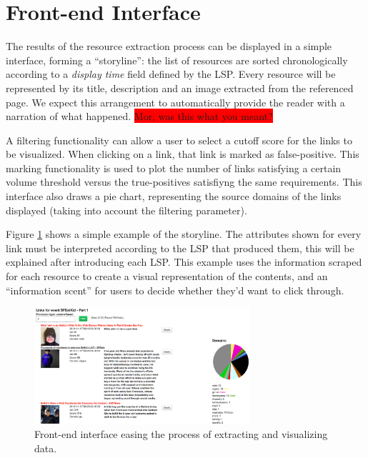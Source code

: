\documentclass{sig-alternate}
\newcommand{\todo}[1]{\colorbox{red}{#1}}
\begin{document}
\section{Front-end Interface}
\label{sec:front-end-interface}
The results of the resource extraction process can be displayed in a simple interface, forming a ``storyline'': the list of resources are sorted chronologically according to a \emph{display time} field defined by the LSP. Every resource will be represented by its title, description and an image extracted from the referenced page. We expect this arrangement to automatically provide the reader with a narration of what happened. \todo{Mor, was this what you meant?}

A filtering functionality can allow a user to select a cutoff score for the links to be visualized. When clicking on a link, that link is marked as false-positive. This marking functionality is used to plot the number of links satisfying a certain volume threshold versus the true-positives satisfiyng the same requirements. This interface also draws a pie chart, representing the source domains of the links displayed (taking into account the filtering parameter).

Figure \ref{fig:javascript_interface} shows a simple example of the storyline. The attributes shown for every link must be interpreted according to the LSP that produced them, this will be explained after introducing each LSP. This example uses the information scraped for each resource to create a visual representation of the contents, and an ``information scent'' for users to decide whether they'd want to click through. %
\begin{figure}[htbp]
  \centering
  \includegraphics[width=8cm]{Figures/javascript_interface.png}
  \caption{Front-end interface easing the process of extracting and visualizing data.}
  \label{fig:javascript_interface}
\end{figure}

\end{document}
